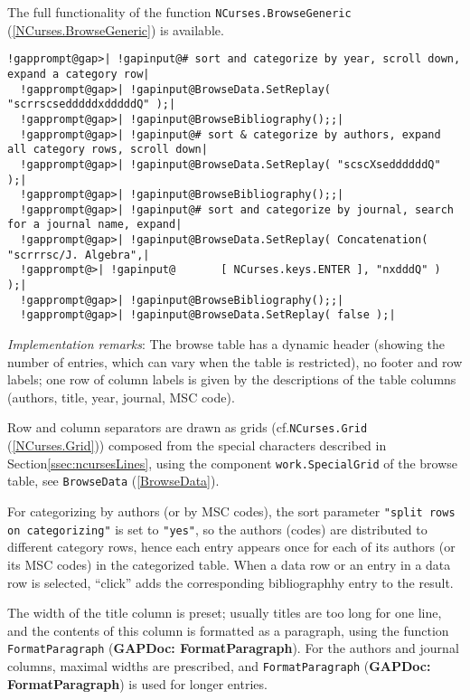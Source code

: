 \documentclass[a4paper,11pt]{report}
\begin{document}
{{{ The full functionality of the function \texttt{NCurses.BrowseGeneric} (\ref{NCurses.BrowseGeneric}) is available. 

 
\begin{Verbatim}[commandchars=!@|,fontsize=\small,frame=single,label=Example]
  !gapprompt@gap>| !gapinput@# sort and categorize by year, scroll down, expand a category row|
  !gapprompt@gap>| !gapinput@BrowseData.SetReplay( "scrrscsedddddxdddddQ" );|
  !gapprompt@gap>| !gapinput@BrowseBibliography();;|
  !gapprompt@gap>| !gapinput@# sort & categorize by authors, expand all category rows, scroll down|
  !gapprompt@gap>| !gapinput@BrowseData.SetReplay( "scscXseddddddQ" );|
  !gapprompt@gap>| !gapinput@BrowseBibliography();;|
  !gapprompt@gap>| !gapinput@# sort and categorize by journal, search for a journal name, expand|
  !gapprompt@gap>| !gapinput@BrowseData.SetReplay( Concatenation( "scrrrsc/J. Algebra",|
  !gapprompt@>| !gapinput@       [ NCurses.keys.ENTER ], "nxdddQ" ) );|
  !gapprompt@gap>| !gapinput@BrowseBibliography();;|
  !gapprompt@gap>| !gapinput@BrowseData.SetReplay( false );|
\end{Verbatim}
 

 \emph{Implementation remarks}: The browse table has a dynamic header (showing the number of entries, which
can vary when the table is restricted), no footer and row labels; one row of
column labels is given by the descriptions of the table columns (authors,
title, year, journal, MSC code). 

 Row and column separators are drawn as grids (cf.{\nobreakspace}\texttt{NCurses.Grid} (\ref{NCurses.Grid})) composed from the special characters described in Section{\nobreakspace}\ref{ssec:ncursesLines}, using the component \texttt{work.SpecialGrid} of the browse table, see \texttt{BrowseData} (\ref{BrowseData}). 

 For categorizing by authors (or by MSC codes), the sort parameter \texttt{"split rows on categorizing"} is set to \texttt{"yes"}, so the authors (codes) are distributed to different category rows, hence
each entry appears once for each of its authors (or its MSC codes) in the
categorized table. When a data row or an entry in a data row is selected, ``click'' adds the corresponding bibliographhy entry to the result. 

 The width of the title column is preset; usually titles are too long for one
line, and the contents of this column is formatted as a paragraph, using the
function \texttt{FormatParagraph} (\textbf{GAPDoc: FormatParagraph}). For the authors and journal columns, maximal widths are prescribed, and \texttt{FormatParagraph} (\textbf{GAPDoc: FormatParagraph}) is used for longer entries. 

}}}
\end{document}
